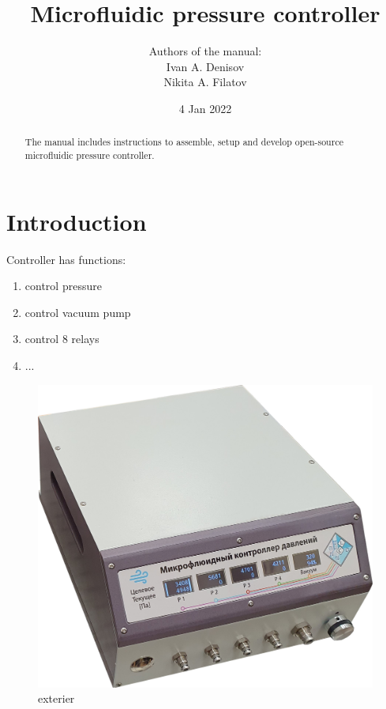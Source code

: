 \documentclass[twoside, 12pt, a4paper]{refart}
\title{Microfluidic pressure controller}
\author{
Authors of the manual: \\
Ivan A. Denisov \\
Nikita A. Filatov \\
}
\date{4 Jan 2022}
\begin{document}
\maketitle

\begin{abstract}
The manual includes instructions to assemble, setup and develop open-source microfluidic pressure controller.
\end{abstract}

\tableofcontents

\newpage



\section{Introduction}
\label{intro}

Controller has functions:
\begin{enumerate}

\item control pressure
    
\item control vacuum pump

\item control 8 relays

\item ...
        
\end{enumerate}

\begin{figure}[h!b]
	\begin{center}
	\includegraphics[width=\textwidth]{imgs/device.jpg}
	\caption{exterier}
	\label{fig:device}
	\end{center}
\end{figure}
\end{document}
